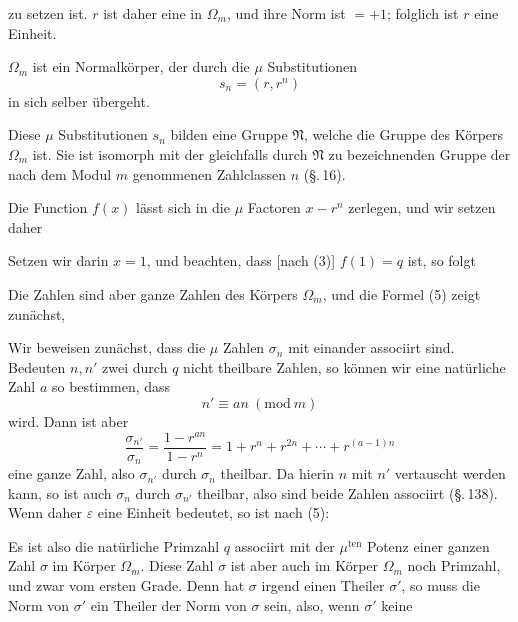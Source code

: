 zu setzen ist. $r$ ist daher eine  in $\Omega_m$, und ihre Norm ist $=+1$; folglich ist $r$ eine Einheit.

$\Omega_m$ ist ein Normalk\"orper, der durch die $\mu$ Substitutionen
\[ s_n = (r, r^n) \]
in sich selber \"ubergeht.

Diese $\mu$ Substitutionen $s_n$ bilden eine  Gruppe $\mathfrak{N}$, welche die  Gruppe des K\"orpers $\Omega_m$ ist. Sie ist isomorph mit der gleichfalls durch $\mathfrak{N}$ zu bezeichnenden Gruppe der nach dem Modul $m$ genommenen Zahlclassen $n$ (\S.\,16).

Die Function $f(x)$ l\"asst sich in die $\mu$ Factoren $x - r^n$ zerlegen, und wir setzen daher

Setzen wir darin $x=1$, und beachten, dass [nach (3)] $f(1) = q$ ist, so folgt

Die Zahlen
sind aber ganze Zahlen des K\"orpers $\Omega_m$, und die Formel (5) zeigt zun\"achst, 

Wir beweisen zun\"achst, dass die $\mu$ Zahlen $\sigma_n$ mit einander associirt sind. Bedeuten $n, n'$ zwei durch $q$ nicht theilbare Zahlen, so k\"onnen wir eine nat\"urliche Zahl $a$ so bestimmen, dass
\[ n' \equiv a n \ (\mathrm{mod}\ m) \]
wird. Dann ist aber
\[ \frac{\sigma_{n'}}{\sigma_n} = \frac{1 - r^{an}}{1 - r^n} = 1 + r^n + r^{2n} + \cdots + r^{(a-1)n} \]
eine ganze Zahl, also $\sigma_{n'}$ durch $\sigma_n$ theilbar. Da hierin $n$ mit $n'$ vertauscht werden kann, so ist auch $\sigma_n$ durch $\sigma_{n'}$ theilbar, also sind beide Zahlen associirt (\S.\,138). Wenn daher $\varepsilon$ eine Einheit bedeutet, so ist nach (5):

Es ist also die nat\"urliche Primzahl $q$ associirt mit der $\mu^{\text{ten}}$ Potenz einer ganzen Zahl $\sigma$ im K\"orper $\Omega_m$. Diese Zahl $\sigma$ ist aber auch im K\"orper $\Omega_m$ noch Primzahl, und zwar vom ersten Grade. Denn hat $\sigma$ irgend einen Theiler $\sigma'$, so muss die Norm von $\sigma'$ ein Theiler der Norm von $\sigma$ sein, also, wenn $\sigma'$ keine
